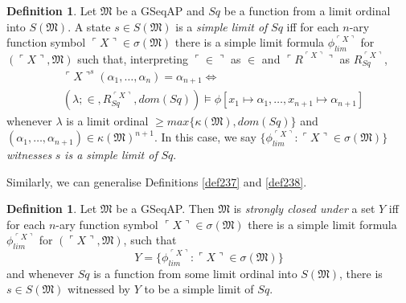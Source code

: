 \documentclass[12pt, twoside]{memoir}
\numberwithin{equation}{section}
\theoremstyle{definition}
\newtheorem{defi}[thm]{Definition}
\theoremstyle{remark}
\theoremstyle{definition}
\theoremstyle{definition}
\theoremstyle{definition}
\theoremstyle{remark}
\begin{document}
\begin{defi}\label{def256}
Let $\mathfrak{M}$ be a GSeqAP and $Sq$ be a function from a limit ordinal into $S(\mathfrak{M})$. A state $s \in S(\mathfrak{M})$ is a \emph{simple limit of} $Sq$ iff for each $n$-ary function symbol $\ulcorner X \urcorner \in \sigma(\mathfrak{M})$ there is a simple limit formula $\phi_{lim}^{\ulcorner X \urcorner}$ for $(\ulcorner X \urcorner, \mathfrak{M})$ such that, interpreting $\ulcorner \in \urcorner$ as $\in$ and $\ulcorner R^{\ulcorner X \urcorner} \urcorner$ as $R_{Sq}^{\ulcorner X \urcorner}$, 
\begin{align*}
    & \ulcorner X \urcorner^s (\alpha_1, \dots, \alpha_n) = \alpha_{n+1} \iff \\
    & (\lambda; \in, R_{Sq}^{\ulcorner X \urcorner}, dom(Sq)) \models \phi[x_1 \mapsto \alpha_1, \dots, x_{n+1} \mapsto \alpha_{n+1}]
\end{align*}
whenever $\lambda$ is a limit ordinal $\geq max\{\kappa(\mathfrak{M}), dom(Sq)\}$ and $(\alpha_1, \dots, \alpha_{n+1}) \in \kappa(\mathfrak{M})^{n+1}$. In this case, we say $\{\phi_{lim}^{\ulcorner X \urcorner} : \ulcorner X \urcorner \in \sigma(\mathfrak{M})\}$ \emph{witnesses} $s$ \emph{is a simple limit of} $Sq$.
\end{defi}

Similarly, we can generalise Definitions \ref{def237} and \ref{def238}.

\begin{defi}\label{def257p}
Let $\mathfrak{M}$ be a GSeqAP. Then $\mathfrak{M}$ is \emph{strongly closed under} a set $Y$ iff for each $n$-ary function symbol $\ulcorner X \urcorner \in \sigma(\mathfrak{M})$ there is a simple limit formula $\phi_{lim}^{\ulcorner X \urcorner}$ for $(\ulcorner X \urcorner, \mathfrak{M})$, such that 
\begin{equation*}
    Y = \{\phi_{lim}^{\ulcorner X \urcorner} : \ulcorner X \urcorner \in \sigma(\mathfrak{M})\}
\end{equation*}
and whenever $Sq$ is a function from some limit ordinal into $S(\mathfrak{M})$, there is $s \in S(\mathfrak{M})$ witnessed by $Y$ to be a simple limit of $Sq$.
\end{defi}
\end{document}
